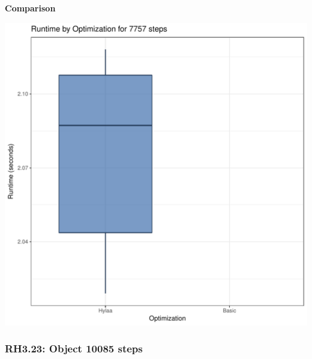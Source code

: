 \documentclass{article}\usepackage[]{graphicx}\usepackage[]{color}
\makeatletter
\def\maxwidth{ %
  \ifdim\Gin@nat@width>\linewidth
    \linewidth
  \else
    \Gin@nat@width
  \fi
}
\newenvironment{knitrout}{}{} %
\makeatother
\begin{document}
 \textbf{Comparison}
  
\begin{knitrout}
\color{fgcolor}
\includegraphics[width=\maxwidth]{figure/RH3_steps7757-1} 

\end{knitrout}


\subsubsection{RH3.23: Object 10085 steps}
\end{document}
